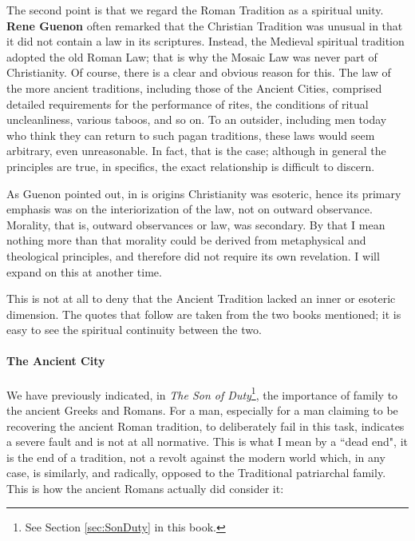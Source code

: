 The second point is that we regard the Roman Tradition as a spiritual unity. \textbf{Rene Guenon} often remarked that the Christian Tradition was unusual in that it did not contain a law in its scriptures. Instead, the Medieval spiritual tradition adopted the old Roman Law; that is why the Mosaic Law was never part of Christianity. Of course, there is a clear and obvious reason for this. The law of the more ancient traditions, including those of the Ancient Cities, comprised detailed requirements for the performance of rites, the conditions of ritual uncleanliness, various taboos, and so on. To an outsider, including men today who think they can return to such pagan traditions, these laws would seem arbitrary, even unreasonable. In fact, that is the case; although in general the principles are true, in specifics, the exact relationship is difficult to discern.

As Guenon pointed out, in is origins Christianity was esoteric, hence its primary emphasis was on the interiorization of the law, not on outward observance. Morality, that is, outward observances or law, was secondary. By that I mean nothing more than that morality could be derived from metaphysical and theological principles, and therefore did not require its own revelation. I will expand on this at another time.

This is not at all to deny that the Ancient Tradition lacked an inner or esoteric dimension. The quotes that follow are taken from the two books mentioned; it is easy to see the spiritual continuity between the two.

\paragraph{The Ancient City}
We have previously indicated, in \textit{The Son of Duty}\footnote{See Section \ref{sec:SonDuty} in this book.}, the importance of family to the ancient Greeks and Romans. For a man, especially for a man claiming to be recovering the ancient Roman tradition, to deliberately fail in this task, indicates a severe fault and is not at all normative. This is what I mean by a ``dead end", it is the end of a tradition, not a revolt against the modern world which, in any case, is similarly, and radically, opposed to the Traditional patriarchal family. This is how the ancient Romans actually did consider it:

